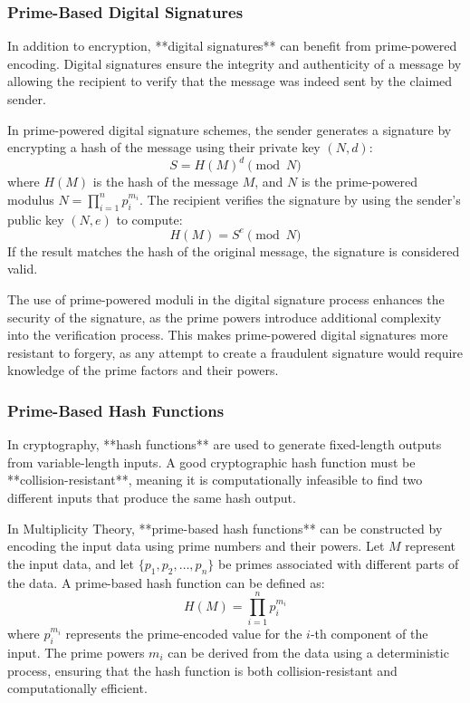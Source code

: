 \documentclass[12pt]{article}
\begin{document}
\subsubsection{Prime-Based Digital Signatures}

In addition to encryption, **digital signatures** can benefit from prime-powered encoding. Digital signatures ensure the integrity and authenticity of a message by allowing the recipient to verify that the message was indeed sent by the claimed sender.

In prime-powered digital signature schemes, the sender generates a signature by encrypting a hash of the message using their private key \( (N, d) \):
\[
S = H(M)^d \pmod{N}
\]
where \( H(M) \) is the hash of the message \( M \), and \( N \) is the prime-powered modulus \( N = \prod_{i=1}^{n} p_i^{m_i} \). The recipient verifies the signature by using the sender’s public key \( (N, e) \) to compute:
\[
H(M) = S^e \pmod{N}
\]
If the result matches the hash of the original message, the signature is considered valid.

The use of prime-powered moduli in the digital signature process enhances the security of the signature, as the prime powers introduce additional complexity into the verification process. This makes prime-powered digital signatures more resistant to forgery, as any attempt to create a fraudulent signature would require knowledge of the prime factors and their powers.

\subsubsection{Prime-Based Hash Functions}

In cryptography, **hash functions** are used to generate fixed-length outputs from variable-length inputs. A good cryptographic hash function must be **collision-resistant**, meaning it is computationally infeasible to find two different inputs that produce the same hash output.

In Multiplicity Theory, **prime-based hash functions** can be constructed by encoding the input data using prime numbers and their powers. Let \( M \) represent the input data, and let \( \{p_1, p_2, \dots, p_n\} \) be primes associated with different parts of the data. A prime-based hash function can be defined as:
\[
H(M) = \prod_{i=1}^{n} p_i^{m_i}
\]
where \( p_i^{m_i} \) represents the prime-encoded value for the \( i \)-th component of the input. The prime powers \( m_i \) can be derived from the data using a deterministic process, ensuring that the hash function is both collision-resistant and computationally efficient.
\end{document}
